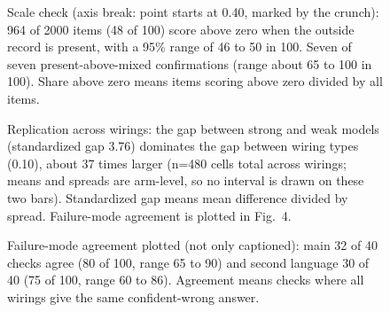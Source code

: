 \documentclass[11pt,a4paper]{article}
\begin{document}
\begin{figure}[h]
\centering
{}
\caption{Scale check (axis break: point starts at 0.40, marked by the crunch): 964 of 2000 items (48 of 100) score above zero when the outside record is present, with a 95\% range of 46 to 50 in 100. Seven of seven present-above-mixed confirmations (range about 65 to 100 in 100). Share above zero means items scoring above zero divided by all items.}
\end{figure}

\begin{figure}[h]
\centering
{}
\caption{Replication across wirings: the gap between strong and weak models (standardized gap 3.76) dominates the gap between wiring types (0.10), about 37 times larger (n=480 cells total across wirings; means and spreads are arm-level, so no interval is drawn on these two bars). Standardized gap means mean difference divided by spread. Failure-mode agreement is plotted in Fig.~4.}
\end{figure}

\begin{figure}[h]
\centering
{}
\caption{Failure-mode agreement plotted (not only captioned): main 32 of 40 checks agree (80 of 100, range 65 to 90) and second language 30 of 40 (75 of 100, range 60 to 86). Agreement means checks where all wirings give the same confident-wrong answer.}
\end{figure}
\end{document}
